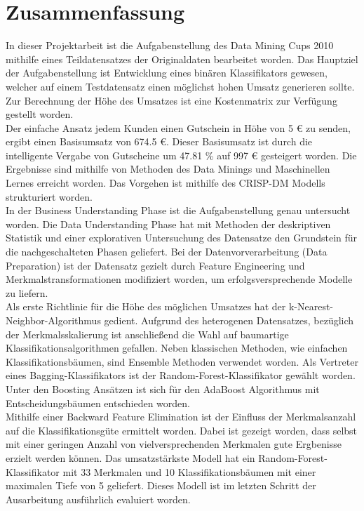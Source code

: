\chapter{Zusammenfassung}

In dieser Projektarbeit ist die Aufgabenstellung des Data Mining Cups 2010 mithilfe eines Teildatensatzes der Originaldaten bearbeitet worden. Das Hauptziel der Aufgabenstellung ist Entwicklung eines binären Klassifikators gewesen, welcher auf einem Testdatensatz einen möglichst hohen Umsatz generieren sollte. Zur Berechnung der Höhe des Umsatzes ist eine Kostenmatrix zur Verfügung gestellt worden.\\ 

Der einfache Ansatz jedem Kunden einen Gutschein in Höhe von 5 \euro{} zu senden, ergibt einen Basisumsatz von 674.5 \euro{}. Dieser Basisumsatz ist durch die intelligente Vergabe von Gutscheine um 47.81 \% auf 997 \euro{} gesteigert worden. Die Ergebnisse sind mithilfe von Methoden des Data Minings und Maschinellen Lernes erreicht worden. Das Vorgehen ist mithilfe des CRISP-DM Modells strukturiert worden.\\ 

In der Business Understanding Phase ist die Aufgabenstellung genau untersucht worden. Die Data Understanding Phase hat mit Methoden der deskriptiven Statistik und einer explorativen Untersuchung des Datensatze den Grundstein für die nachgeschalteten Phasen geliefert. Bei der Datenvorverarbeitung (Data Preparation) ist der Datensatz gezielt durch Feature Engineering und Merkmalstransformationen modifiziert worden, um erfolgsversprechende Modelle zu liefern.\\

Als erste Richtlinie für die Höhe des möglichen Umsatzes hat der k-Nearest-Neighbor-Algorithmus gedient. Aufgrund des heterogenen Datensatzes, bezüglich der Merkmalsskalierung ist anschließend die Wahl auf baumartige Klassifikationsalgorithmen gefallen. Neben klassischen Methoden, wie einfachen Klassifikationsbäumen, sind Ensemble Methoden verwendet worden. Als Vertreter eines Bagging-Klassifikators ist der Random-Forest-Klassifikator gewählt worden. Unter den Boosting Ansätzen ist sich für den AdaBoost Algorithmus mit Entscheidungsbäumen entschieden worden.\\

Mithilfe einer Backward Feature Elimination ist der Einfluss der Merkmalsanzahl auf die Klassifikationsgüte ermittelt worden. Dabei ist gezeigt worden, dass selbst mit einer geringen Anzahl von vielversprechenden Merkmalen gute Ergbenisse erzielt werden können. Das umsatzstärkste Modell hat ein Random-Forest-Klassifikator mit 33 Merkmalen und 10 Klassifikationsbäumen mit einer maximalen Tiefe von 5 geliefert. Dieses Modell ist im letzten Schritt der Ausarbeitung ausführlich evaluiert worden. 




